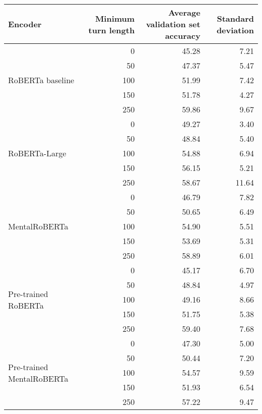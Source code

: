 \begin{tabular}{lrrr}
\toprule
Encoder & Minimum turn length & Average validation set accuracy & Standard deviation \\
\midrule
\multirow{5}{*}{RoBERTa baseline} & 0 & 45.28 & 7.21 \\
& 50 & 47.37 & 5.47 \\
& 100 & 51.99 & 7.42 \\
& 150 & 51.78 & 4.27 \\
& 250 & 59.86 & 9.67 \\
\midrule
\multirow{5}{*}{RoBERTa-Large} & 0 & 49.27 & 3.40 \\
& 50 & 48.84 & 5.40 \\
& 100 & 54.88 & 6.94 \\
& 150 & 56.15 & 5.21 \\
& 250 & 58.67 & 11.64 \\
\midrule
\multirow{5}{*}{MentalRoBERTa} & 0 & 46.79 & 7.82 \\
& 50 & 50.65 & 6.49 \\
& 100 & 54.90 & 5.51 \\
& 150 & 53.69 & 5.31 \\
& 250 & 58.89 & 6.01 \\
\midrule
\multirow{5}{*}{Pre-trained RoBERTa} & 0 & 45.17 & 6.70 \\
& 50 & 48.84 & 4.97 \\
& 100 & 49.16 & 8.66 \\
& 150 & 51.75 & 5.38 \\
& 250 & 59.40 & 7.68 \\
\midrule
\multirow{5}{*}{Pre-trained MentalRoBERTa} & 0 & 47.30 & 5.00 \\
& 50 & 50.44 & 7.20 \\
& 100 & 54.57 & 9.59 \\
& 150 & 51.93 & 6.54 \\
& 250 & 57.22 & 9.47 \\
\bottomrule
\end{tabular}
